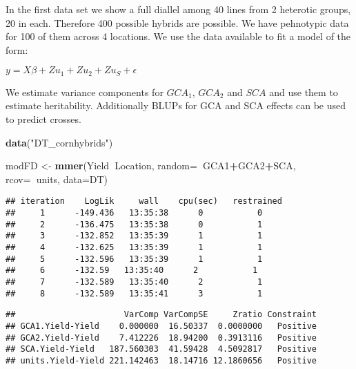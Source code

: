 \documentclass[]{article}
\newenvironment{Shaded}{\begin{snugshade}}{\end{snugshade}}
\newcommand{\KeywordTok}[1]{\textcolor[rgb]{0.13,0.29,0.53}{\textbf{#1}}}
\newcommand{\DataTypeTok}[1]{\textcolor[rgb]{0.13,0.29,0.53}{#1}}
\newcommand{\StringTok}[1]{\textcolor[rgb]{0.31,0.60,0.02}{#1}}
\newcommand{\OperatorTok}[1]{\textcolor[rgb]{0.81,0.36,0.00}{\textbf{#1}}}
\newcommand{\NormalTok}[1]{#1}
\begin{document}
In the first data set we show a full diallel among 40 lines from 2
heterotic groups, 20 in each. Therefore 400 possible hybrids are
possible. We have pehnotypic data for 100 of them across 4 locations. We
use the data available to fit a model of the form:

\(y = X\beta + Zu_1 + Zu_2 + Zu_S + \epsilon\)

We estimate variance components for \(GCA_1\), \(GCA_2\) and \(SCA\) and
use them to estimate heritability. Additionally BLUPs for GCA and SCA
effects can be used to predict crosses.

\begin{Shaded}
\begin{Highlighting}[]
\KeywordTok{data}\NormalTok{(}\StringTok{"DT_cornhybrids"}\NormalTok{)}

\NormalTok{modFD <-}\StringTok{ }\KeywordTok{mmer}\NormalTok{(Yield}\OperatorTok{~}\NormalTok{Location, }
               \DataTypeTok{random=}\OperatorTok{~}\NormalTok{GCA1}\OperatorTok{+}\NormalTok{GCA2}\OperatorTok{+}\NormalTok{SCA, }
               \DataTypeTok{rcov=}\OperatorTok{~}\NormalTok{units,}
               \DataTypeTok{data=}\NormalTok{DT)}
\end{Highlighting}
\end{Shaded}

\begin{verbatim}
## iteration    LogLik     wall    cpu(sec)   restrained
##     1      -149.436   13:35:38      0           0
##     2      -136.475   13:35:38      0           1
##     3      -132.852   13:35:39      1           1
##     4      -132.625   13:35:39      1           1
##     5      -132.596   13:35:39      1           1
##     6      -132.59   13:35:40      2           1
##     7      -132.589   13:35:40      2           1
##     8      -132.589   13:35:41      3           1
\end{verbatim}

\begin{Shaded}
\end{Shaded}

\begin{verbatim}
##                      VarComp VarCompSE     Zratio Constraint
## GCA1.Yield-Yield    0.000000  16.50337  0.0000000   Positive
## GCA2.Yield-Yield    7.412226  18.94200  0.3913116   Positive
## SCA.Yield-Yield   187.560303  41.59428  4.5092817   Positive
## units.Yield-Yield 221.142463  18.14716 12.1860656   Positive
\end{verbatim}
\end{document}
